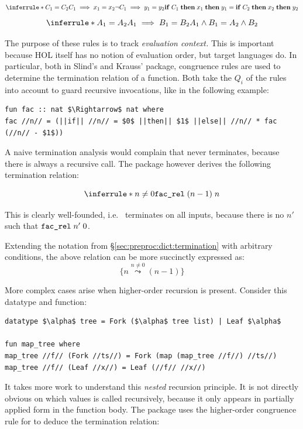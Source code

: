 \[
  \inferrule*{
    C_1 = C_2 \\
    C_1 \implies x_1 = x_2 \\
    \neg C_1 \implies y_1 = y_2
  }{
    \holkeyword{if}\;C_1\;\holkeyword{then}\;x_1\;\holkeyword{then}\;y_1 =
    \holkeyword{if}\;C_2\;\holkeyword{then}\;x_2\;\holkeyword{then}\;y_2
  }
\]
\[
  \inferrule*{
    A_1 = A_2 \\
    A_1 \implies B_1 = B_2
  }{
    A_1 \wedge B_1 = A_2 \wedge B_2
  }
\]

\noindent
The purpose of these rules is to track \emph{evaluation context.}
This is important because HOL itself has no notion of evaluation order, but target languages do.
In particular, both in Slind's  and Krauss'  package, congruence rules are used to determine the termination relation of a function.
Both take the $Q_i$ of the rules into account to guard recursive invocations, like in the following example:
%
\begin{lstlisting}[language=Isabelle]
fun fac :: nat $\Rightarrow$ nat where
fac //n// = (||if|| //n// = $0$ ||then|| $1$ ||else|| //n// * fac (//n// - $1$))
\end{lstlisting}
%
A naive termination analysis would complain that  never terminates, because there is always a recursive call.
The  package however derives the following termination relation:

\[
  \inferrule*{n \neq 0}{\holconst{fac\_rel}\;(n - 1)\;n}
\]

\noindent
This is clearly well-founded, i.e.\  terminates on all inputs, because there is no $n'$ such that $\texttt{\textup{fac\_rel}}\;n'\;0$.

Extending the notation from §\ref{sec:preproc:dict:termination} with arbitrary conditions, the above relation can be more succinctly expressed as:
\[
  \{ n \stackrel{n \neq 0}{\leadsto} (n-1) \}
\]

\noindent
More complex cases arise when higher-order recursion is present.
Consider this datatype and function:
%
\begin{lstlisting}[language=Isabelle]
datatype $\alpha$ tree = Fork ($\alpha$ tree list) | Leaf $\alpha$

fun map_tree where
map_tree //f// (Fork //ts//) = Fork (map (map_tree //f//) //ts//)
map_tree //f// (Leaf //x//) = Leaf (//f// //x//)
\end{lstlisting}
%
It takes more work to understand this \emph{nested} recursion principle.
It is not directly obvious on which values  is called recursively, because it only appears in partially applied form in the function body.
The  package uses the higher-order congruence rule for  to deduce the termination relation:

